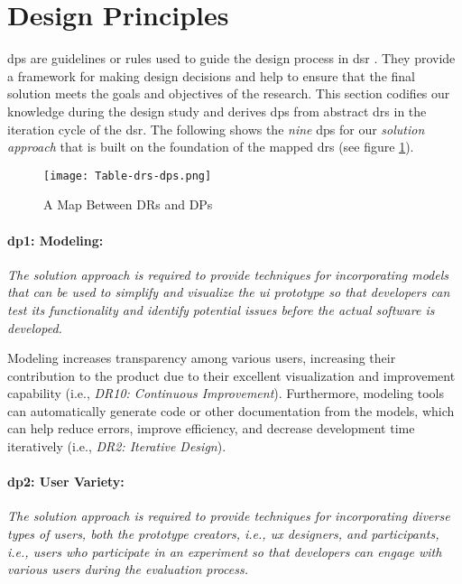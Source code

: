 \section{Design Principles}
\label{design:section:designprinciple}
\ac{dp}s are guidelines or rules used to guide the design process in \ac{dsr} \cite{misc:dsr:henver}. 
They provide a framework for making design decisions \cite{paper:designprinciple:gregor} and help to ensure that the final solution meets the goals and objectives of the research. 
This section codifies our knowledge during the design study and derives \ac{dp}s from abstract \ac{dr}s in the iteration cycle of the \ac{dsr}.
The following shows the \textit{nine} \ac{dp}s for our \textit{solution approach} that is built on the foundation of the mapped \ac{dr}s (see figure \ref{fig:design:table-drs-dps}). 
\begin{figure}[htbp!]
  \centering    
  \texttt{[image: Table-drs-dps.png]}
  \caption[A Map Between DRs and DPs]{A Map Between DRs and DPs}
  \label{fig:design:table-drs-dps}
\end{figure}
\clearpage

\paragraph{\ac{dp}1: Modeling:} \textit{The solution approach is required to provide techniques for incorporating models that can be used to simplify and visualize the \ac{ui} prototype so that developers can test its functionality and identify potential issues before the actual software is developed.}

Modeling increases transparency among various users, increasing their contribution to the product due to their excellent visualization and improvement capability (i.e., \textit{DR10: Continuous Improvement}).
Furthermore, modeling tools can automatically generate code or other documentation from the models, which can help reduce errors, improve efficiency, and decrease development time iteratively (i.e., \textit{DR2: Iterative Design}).

\paragraph{\ac{dp}2: User Variety:} \textit{The solution approach is required to provide techniques for incorporating diverse types of users, both the prototype creators, i.e., \ac{ux} designers, and participants, i.e., users who participate in an experiment so that developers can engage with various users during the evaluation process.}

